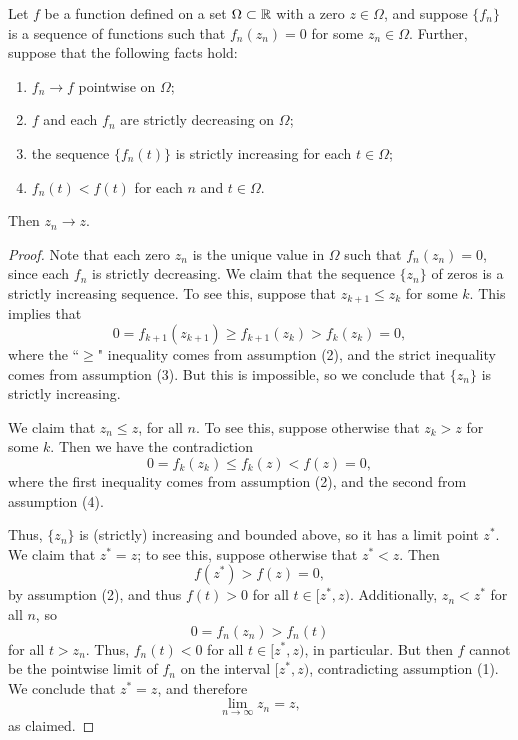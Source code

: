 \begin{lemma} \label{th:zeroconv}
	Let $f$ be a function defined on a set $\Omega \subset \mathbb{R}$ with a zero $z \in \Omega$, and suppose $\{f_n\}$ is a sequence of functions such that $f_n(z_n) = 0$ for some $z_n \in \Omega$. Further, suppose that the following facts hold:
	\begin{enumerate}
		\item $f_n \to f$ pointwise on $\Omega$;
		\item $f$ and each $f_n$ are strictly decreasing on $\Omega$;
		\item the sequence $\{f_n(t)\}$ is strictly increasing for each $t \in \Omega$;
		\item $f_n(t) < f(t)$ for each $n$ and $t \in \Omega$. 
	\end{enumerate}
Then $z_n \to z$.
\end{lemma}

\begin{proof}
	Note that each zero $z_n$ is the unique value in $\Omega$ such that $f_n(z_n) = 0$, since each $f_n$ is strictly decreasing. We claim that the sequence $\{z_n\}$ of zeros is a strictly increasing sequence. To see this, suppose that $z_{k + 1} \leq z_k$ for some $k$. This implies that
	\[0 = f_{k+1}(z_{k+1}) \geq f_{k+1}(z_k) > f_k(z_k) = 0,\]
	where the ``$\geq$" inequality comes from assumption (2), and the strict inequality comes from assumption (3). But this is impossible, so we conclude that $\{z_n\}$ is strictly increasing.
	
	
	We claim that $z_n \leq z$, for all $n$. To see this, suppose otherwise that $z_k > z$ for some $k$. Then we have the contradiction
	\[0 = f_k(z_k) \leq f_k(z) < f(z) = 0,\]
	where the first inequality comes from assumption (2), and the second from assumption (4).
	
	Thus, $\{z_n\}$ is (strictly) increasing and bounded above, so it has a limit point $z^*$. We claim that $z^* = z$; to see this, suppose otherwise that $z^* < z$. Then
	\[f(z^*) > f(z) = 0,\]
	by assumption (2), and thus $f(t) > 0$ for all $t \in [z^*, z)$. Additionally, $z_n < z^*$ for all $n$, so
	\[0 = f_n(z_n) > f_n(t)\]
	for all $t > z_n$. Thus, $f_n(t) < 0$ for all $t \in [z^*, z)$, in particular. But then $f$ cannot be the pointwise limit of $f_n$ on the interval $[z^*, z)$, contradicting assumption (1). We conclude that $z^* = z$, and therefore
	\[\lim_{n \to \infty} z_n = z,\]
	as claimed.
\end{proof}

